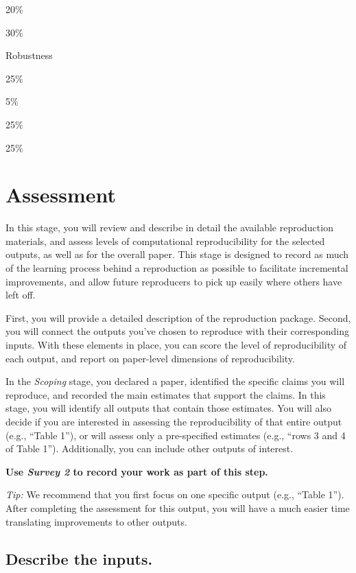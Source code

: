 \documentclass[]{book}
\begin{document}
20\%

30\%

Robustness

25\%

5\%

25\%

25\%

\hypertarget{assessment}{%
\chapter{Assessment}\label{assessment}}

In this stage, you will review and describe in detail the available reproduction materials, and assess levels of computational reproducibility for the selected outputs, as well as for the overall paper. This stage is designed to record as much of the learning process behind a reproduction as possible to facilitate incremental improvements, and allow future reproducers to pick up easily where others have left off.

First, you will provide a detailed description of the reproduction package. Second, you will connect the outputs you've chosen to reproduce with their corresponding inputs. With these elements in place, you can score the level of reproducibility of each output, and report on paper-level dimensions of reproducibility.

In the \emph{Scoping} stage, you declared a paper, identified the specific claims you will reproduce, and recorded the main estimates that support the claims. In this stage, you will identify all outputs that contain those estimates. You will also decide if you are interested in assessing the reproducibility of that entire output (e.g., ``Table 1''), or will assess only a pre-specified estimates (e.g., ``rows 3 and 4 of Table 1''). Additionally, you can include other outputs of interest.

\textbf{Use \emph{Survey 2} to record your work as part of this step.}

\emph{Tip:} We recommend that you first focus on one specific output (e.g., ``Table 1''). After completing the assessment for this output, you will have a much easier time translating improvements to other outputs.

\hypertarget{describe-inputs}{%
\section{Describe the inputs.}\label{describe-inputs}}
\end{document}
